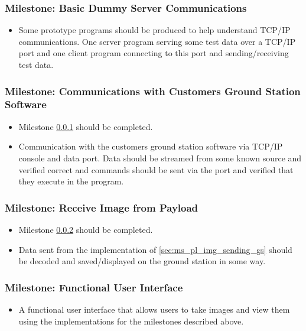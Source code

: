 	\subsubsection{Milestone: Basic Dummy Server Communications}
		\label{sec:ms_basic_dummy_server_comms}
		\begin{itemize}
			\item 	Some prototype programs should be produced to help understand TCP/IP communications.
				One server program serving some test data over a TCP/IP port and one
				client program connecting to this port and sending/receiving test data.
		\end{itemize}

	\subsubsection{Milestone: Communications with Customers Ground Station Software}
		\label{sec:ms_gs_basestation_comms}
		\begin{itemize}
			\item 	Milestone \ref{sec:ms_basic_dummy_server_comms} should be
				completed.
			\item 	Communication with the customers ground station software via TCP/IP console and
				data port. Data should be streamed from some known source and verified correct and
				commands should be sent via the port and verified that they execute in the program.
		\end{itemize}

	\subsubsection{Milestone: Receive Image from Payload}
		\label{sec:ms_gs_recieve_image}
		\begin{itemize}
			\item 	Milestone \ref{sec:ms_gs_basestation_comms} should be completed.
			\item 	Data sent from the implementation of \ref{sec:ms_pl_img_sending_gs} should be
				decoded and saved/displayed on the ground station in some way.
		\end{itemize}

	\subsubsection{Milestone: Functional User Interface}
		\label{sec:ms_gs_func_interface}
		\begin{itemize}
			\item 	A functional user interface that allows users to take images and view them using the implementations
				for the milestones described above.
		\end{itemize}

